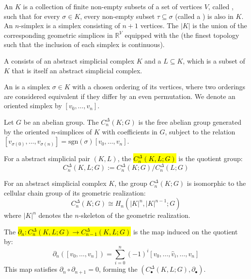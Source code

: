 \begin{definition} 
An  $K$ is a collection of finite non-empty subsets of a set of vertices $V$, called , such that for every $\sigma \in K$, every non-empty subset $\tau \subseteq \sigma$ (called a ) is also in $K$. An $n$-simplex is a simplex consisting of $n+1$ vertices. The  $|K|$ is the union of the corresponding geometric simplices in $\mathbb{R}^V$ equipped with the  (the finest topology such that the inclusion of each simplex is continuous).
\end{definition}

\begin{definition} 
A  consists of an abstract simplicial complex $K$ and a  $L \subseteq K$, which is a subset of $K$ that is itself an abstract simplicial complex. 
\end{definition}

\begin{definition} 
An  is a simplex $\sigma \in K$ with a chosen ordering of its vertices, where two orderings are considered equivalent if they differ by an even permutation. We denote an oriented simplex by $[v_0, \dots, v_n]$.

Let $G$ be an abelian group. The  $C_n^{\Delta}(K; G)$ is the free abelian group generated by the oriented $n$-simplices of $K$ with coefficients in $G$, subject to the relation $[v_{\sigma(0)}, \dots, v_{\sigma(n)}] = \text{sgn}(\sigma) [v_0, \dots, v_n]$.

For a abstract simplicial pair $(K, L)$, the  \hl{$C_n^{\Delta}(K, L; G)$} is the quotient group:
$$C_n^{\Delta}(K, L; G) := C_n^{\Delta}(K; G) / C_n^{\Delta}(L; G)$$
\end{definition}

\begin{lemma} 
For an abstract simplicial complex $K$, the group $C_n^{\Delta}(K; G)$ is isomorphic to the cellular chain group of its geometric realization:
$$C_n^{\Delta}(K; G) \cong H_n(|K|^n, |K|^{n-1}; G)$$
where $|K|^n$ denotes the $n$-skeleton of the geometric realization.
\end{lemma}

\begin{definition} 
The  \hl{$\partial_n: C_n^{\Delta}(K, L; G) \to C_{n-1}^{\Delta}(K, L; G)$} is the map induced on the quotient by:
$$\partial_n([v_0, \dots, v_n]) = \sum_{i=0}^n (-1)^i [v_0, \dots, \hat{v}_i, \dots, v_n]$$
This map satisfies $\partial_n \circ \partial_{n+1} = 0$, forming the  $(C_{\bullet}^{\Delta}(K, L; G), \partial_{\bullet})$.
\end{definition}

